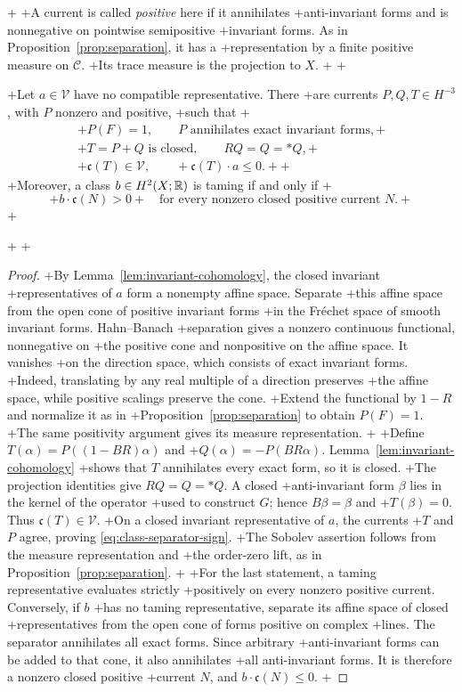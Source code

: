 +
+A current is called \emph{positive} here if it annihilates
+anti-invariant forms and is nonnegative on pointwise semipositive
+invariant forms. As in Proposition~\ref{prop:separation}, it has a
+representation by a finite positive measure on \(\mathscr C\).
+Its trace measure is the projection to \(X\).
+
+\begin{lemma}\label{lem:class-separation}
+Let \(a\in\mathcal V\) have no compatible representative. There
+are currents \(P,Q,T\in H^{-3}\), with \(P\) nonzero and positive,
+such that
+\begin{gather}
+ P(F)=1,\qquad P\text{ annihilates exact invariant forms},
+ \label{eq:class-exact-tests}\\
+ T=P+Q\text{ is closed},\qquad RQ=Q=*Q,
+ \label{eq:class-current}\\
+ \mathfrak c(T)\in\mathcal V,\qquad
+ \mathfrak c(T)\cdot a\le0.
+ \label{eq:class-separator-sign}
+\end{gather}
+Moreover, a class \(b\in H^2(X;\mathbb R)\) is taming if and only if
+\[
+ b\cdot\mathfrak c(N)>0
+ \quad\text{for every nonzero closed positive current }N.
+\]
+\end{lemma}
+
+\begin{proof}
+By Lemma~\ref{lem:invariant-cohomology}, the closed invariant
+representatives of \(a\) form a nonempty affine space. Separate
+this affine space from the open cone of positive invariant forms
+in the Fr\'echet space of smooth invariant forms. Hahn--Banach
+separation gives a nonzero continuous functional, nonnegative on
+the positive cone and nonpositive on the affine space. It vanishes
+on the direction space, which consists of exact invariant forms.
+Indeed, translating by any real multiple of a direction preserves
+the affine space, while positive scalings preserve the cone.
+Extend the functional by \(1-R\) and normalize it as in
+Proposition~\ref{prop:separation} to obtain \(P(F)=1\).
+The same positivity argument gives its measure representation.
+
+Define \(T(\alpha)=P((1-BR)\alpha)\) and
+\(Q(\alpha)=-P(BR\alpha)\). Lemma~\ref{lem:invariant-cohomology}
+shows that \(T\) annihilates every exact form, so it is closed.
+The projection identities give \(RQ=Q=*Q\). A closed
+anti-invariant form \(\beta\) lies in the kernel of the operator
+used to construct \(G\); hence \(B\beta=\beta\) and
+\(T(\beta)=0\). Thus \(\mathfrak c(T)\in\mathcal V\).
+On a closed invariant representative of \(a\), the currents
+\(T\) and \(P\) agree, proving \eqref{eq:class-separator-sign}.
+The Sobolev assertion follows from the measure representation and
+the order-zero lift, as in Proposition~\ref{prop:separation}.
+
+For the last statement, a taming representative evaluates strictly
+positively on every nonzero positive current. Conversely, if \(b\)
+has no taming representative, separate its affine space of closed
+representatives from the open cone of forms positive on complex
+lines. The separator annihilates all exact forms. Since arbitrary
+anti-invariant forms can be added to that cone, it also annihilates
+all anti-invariant forms. It is therefore a nonzero closed positive
+current \(N\), and \(b\cdot\mathfrak c(N)\le0\).
+\end{proof}
